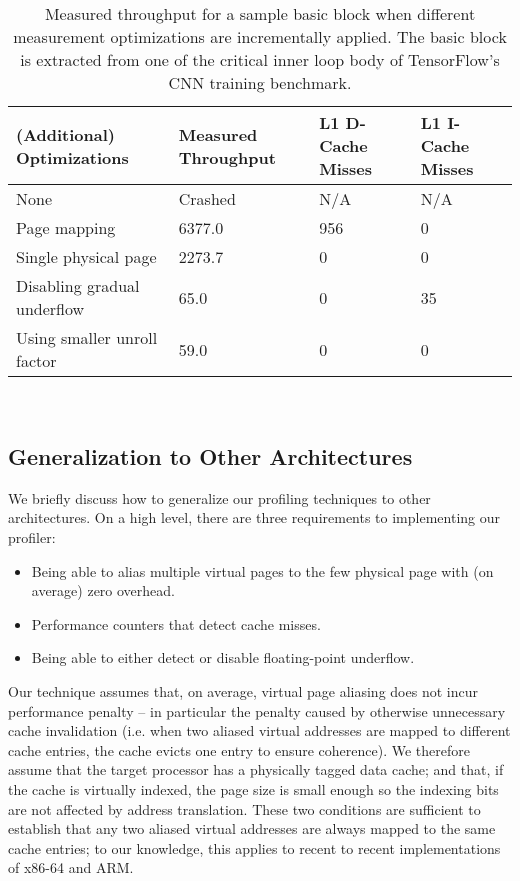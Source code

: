 \begin{table}
\begin{tabular}{
|p{}|p{}|p{}|p{}|}
\hline \textbf{(Additional) Optimizations} &
\textbf{Measured Throughput} &
\textbf{L1 D-Cache Misses} &
\textbf{L1 I-Cache Misses} \\

\hline
None & Crashed & N/A & N/A \\

\hline
Page mapping & 6377.0 & 956 & 0 \\

\hline
Single physical page & 2273.7 & 0 & 0 \\

\hline
Disabling gradual underflow & 65.0 & 0 & 35 \\

\hline
Using smaller unroll factor & 59.0 & 0 & 0\\

\hline
\end{tabular}
\\
\caption{Measured throughput for a sample basic block when
different measurement optimizations are incrementally applied.
The basic block is extracted from one of the critical 
inner loop body of TensorFlow\cite{tensorflow}'s CNN training benchmark.}
\label{tab:ablation}
\end{table}

\subsection{Generalization to Other Architectures}\label{sec:generalization}
We briefly discuss how to generalize our profiling techniques to other architectures.
On a high level, there are three requirements to implementing our profiler:
\begin{itemize}
    \item Being able to alias multiple virtual pages to the few physical page with 
    (on average) zero overhead.
    
    \item Performance counters that detect cache misses.
    
    \item Being able to either detect or disable floating-point underflow.
\end{itemize}

Our technique assumes that, on average, virtual page aliasing does not incur performance penalty -- in particular the penalty 
caused by otherwise unnecessary cache invalidation 
(i.e. when two aliased virtual addresses are mapped to different cache entries,
the cache evicts one entry to ensure coherence).
We therefore assume that the target processor has a physically tagged 
data cache;
and that, if the cache is virtually indexed,
the page size is small enough so the indexing bits are not affected by address translation.
These two conditions are sufficient to establish that any two aliased virtual addresses
are always mapped to the same cache entries;
to our knowledge, this applies to recent to recent implementations of x86-64 and ARM.